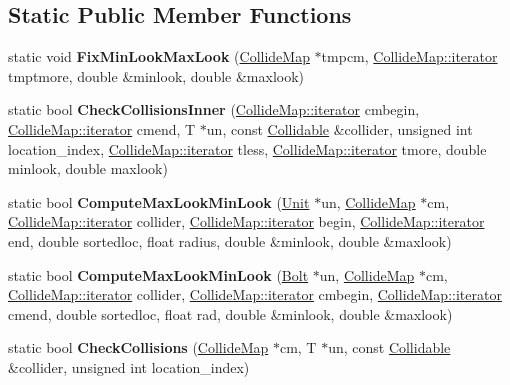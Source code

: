 \subsection*{Static Public Member Functions}
\begin{DoxyCompactItemize}
\item 
static void {\bfseries Fix\+Min\+Look\+Max\+Look} (\hyperlink{classCollideMap}{Collide\+Map} $\ast$tmpcm, \hyperlink{classCollidable}{Collide\+Map\+::iterator} tmptmore, double \&minlook, double \&maxlook)\hypertarget{classCollideChecker_aeec06b65b92b6671d47859be346199e1}{}\label{classCollideChecker_aeec06b65b92b6671d47859be346199e1}

\item 
static bool {\bfseries Check\+Collisions\+Inner} (\hyperlink{classCollidable}{Collide\+Map\+::iterator} cmbegin, \hyperlink{classCollidable}{Collide\+Map\+::iterator} cmend, T $\ast$un, const \hyperlink{classCollidable}{Collidable} \&collider, unsigned int location\+\_\+index, \hyperlink{classCollidable}{Collide\+Map\+::iterator} tless, \hyperlink{classCollidable}{Collide\+Map\+::iterator} tmore, double minlook, double maxlook)\hypertarget{classCollideChecker_a8613e3de11c14709969ab8d20088dfeb}{}\label{classCollideChecker_a8613e3de11c14709969ab8d20088dfeb}

\item 
static bool {\bfseries Compute\+Max\+Look\+Min\+Look} (\hyperlink{classUnit}{Unit} $\ast$un, \hyperlink{classCollideMap}{Collide\+Map} $\ast$cm, \hyperlink{classCollidable}{Collide\+Map\+::iterator} collider, \hyperlink{classCollidable}{Collide\+Map\+::iterator} begin, \hyperlink{classCollidable}{Collide\+Map\+::iterator} end, double sortedloc, float radius, double \&minlook, double \&maxlook)\hypertarget{classCollideChecker_a9e142ed13929d5b832b3697e21aec935}{}\label{classCollideChecker_a9e142ed13929d5b832b3697e21aec935}

\item 
static bool {\bfseries Compute\+Max\+Look\+Min\+Look} (\hyperlink{classBolt}{Bolt} $\ast$un, \hyperlink{classCollideMap}{Collide\+Map} $\ast$cm, \hyperlink{classCollidable}{Collide\+Map\+::iterator} collider, \hyperlink{classCollidable}{Collide\+Map\+::iterator} cmbegin, \hyperlink{classCollidable}{Collide\+Map\+::iterator} cmend, double sortedloc, float rad, double \&minlook, double \&maxlook)\hypertarget{classCollideChecker_a1ed8fd76a1a06727c6b389a5f1e58306}{}\label{classCollideChecker_a1ed8fd76a1a06727c6b389a5f1e58306}

\item 
static bool {\bfseries Check\+Collisions} (\hyperlink{classCollideMap}{Collide\+Map} $\ast$cm, T $\ast$un, const \hyperlink{classCollidable}{Collidable} \&collider, unsigned int location\+\_\+index)\hypertarget{classCollideChecker_a12f8d74d1bce8374fda9b960280e7857}{}\label{classCollideChecker_a12f8d74d1bce8374fda9b960280e7857}


\end{DoxyCompactItemize}
